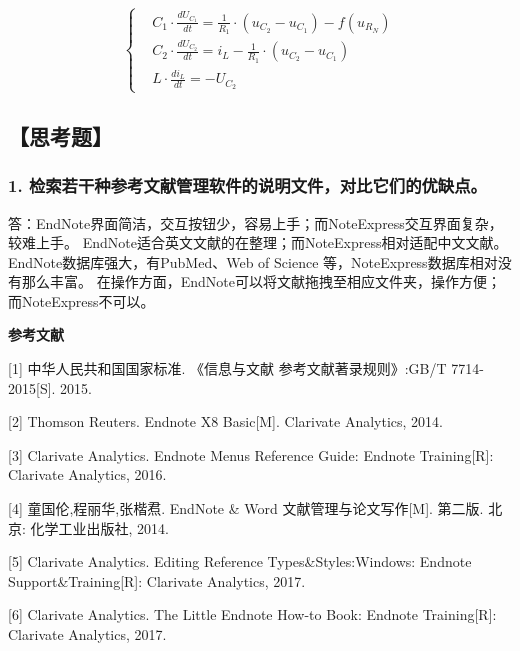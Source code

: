 \documentclass[12pt,a4paper,UTF8]{ctexart}
\begin{document}
\[\left\{%
\begin{aligned}
&C_{1} \cdot \frac{d U_{C_{1}}}{d t}=\frac{1}{R_{1}} \cdot(u_{C_{2}}-u_{C_{1}})-f(u_{R_{N}}) \\
&C_{2} \cdot \frac{d U_{C_{2}}}{d t}=i_{L}-\frac{1}{R_{1}} \cdot(u_{C_{2}}-u_{C_{1}}) \\
&L \cdot \frac{d i_{L}}{d t}=-U_{C_{2}}
\end{aligned}
\right.
\]



\subsection*{【思考题】}

	\subsubsection*{1. 检索若干种参考文献管理软件的说明文件，对比它们的优缺点。}
	答：EndNote界面简洁，交互按钮少，容易上手；而NoteExpress交互界面复杂，较难上手。
	EndNote适合英文文献的在整理；而NoteExpress相对适配中文文献。
	EndNote数据库强大，有PubMed、Web of Science 等，NoteExpress数据库相对没有那么丰富。
	在操作方面，EndNote可以将文献拖拽至相应文件夹，操作方便；而NoteExpress不可以。

	
	\newpage
	\begin{center}
		\textbf{参考文献}
	\end{center}

[1] 中华人民共和国国家标准. 《信息与文献 参考文献著录规则》:GB/T 7714-
2015[S]. 2015.

[2] Thomson Reuters. Endnote X8 Basic[M]. Clarivate Analytics, 2014.

[3] Clarivate Analytics. Endnote Menus Reference Guide: Endnote Training[R]:
Clarivate Analytics, 2016.

[4] 童国伦,程丽华,张楷焄. EndNote \& Word 文献管理与论文写作[M]. 第二版. 
北京: 化学工业出版社, 2014.

[5] Clarivate Analytics. Editing Reference Types\&Styles:Windows: Endnote 
Support\&Training[R]: Clarivate Analytics, 2017.

[6] Clarivate Analytics. The Little Endnote How-to Book: Endnote Training[R]:
Clarivate Analytics, 2017.
	
\end{document}
